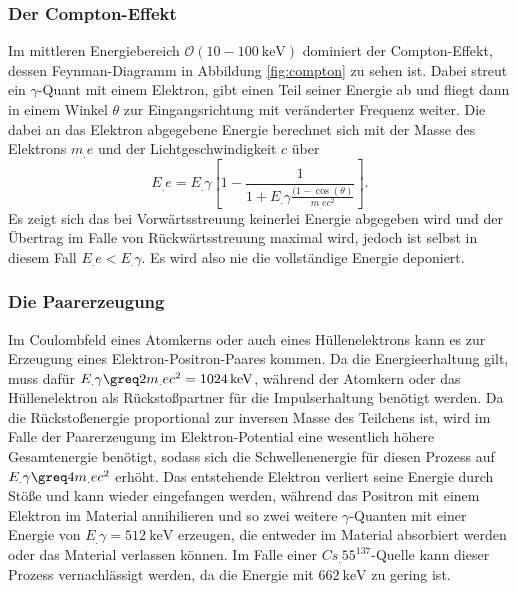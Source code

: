 \subsubsection{Der Compton-Effekt}

Im mittleren Energiebereich $\mathcal{O}(10 - \SI{100}{\kilo\eV})$ dominiert der Compton-Effekt, dessen Feynman-Diagramm in Abbildung \ref{fig:compton} zu sehen ist.
Dabei streut ein $\gamma$-Quant mit einem Elektron, gibt einen Teil seiner Energie ab und fliegt dann in einem Winkel $\theta$ zur Eingangsrichtung mit veränderter Frequenz weiter.
Die dabei an das Elektron abgegebene Energie berechnet sich mit der Masse des Elektrons $m_.e$ und der Lichtgeschwindigkeit $c$ über
\[
E_.e = E_.{\gamma}\left[1-\frac{1}{1+E_.{\gamma}\frac{(1-\cos(\theta)}{m_.ec^2}}\right]\text{.}
\]
Es zeigt sich das bei Vorwärtsstreuung keinerlei Energie abgegeben wird und der Übertrag im Falle von Rückwärtsstreuung maximal wird, jedoch ist selbst in diesem Fall $E_.e < E_.{\gamma}$. Es wird also nie die vollständige Energie deponiert.

\subsubsection{Die Paarerzeugung}

Im Coulombfeld eines Atomkerns oder auch eines Hüllenelektrons kann es zur Erzeugung eines Elektron-Positron-Paares kommen. Da die Energieerhaltung gilt, muss dafür $E_.{\gamma} \greq 2m_.ec^2 = \SI{1024}{\kilo\eV}$, während der Atomkern oder das Hüllenelektron als Rückstoßpartner für die Impulserhaltung benötigt werden. Da die Rückstoßenergie proportional zur inversen Masse des Teilchens ist, wird im Falle der Paarerzeugung im Elektron-Potential eine wesentlich höhere Gesamtenergie benötigt, sodass sich die Schwellenenergie für diesen Prozess auf $E_.{\gamma} \greq 4m_.ec^2$ erhöht. Das entstehende Elektron verliert seine Energie durch Stöße und kann wieder eingefangen werden, während das Positron mit einem Elektron im Material annihilieren und so zwei weitere $\gamma$-Quanten mit einer Energie von $E_.{\gamma}=\SI{512}{\kilo\eV}$ erzeugen, die entweder im Material absorbiert werden oder das Material verlassen können. 
Im Falle einer $Cs_.{55}^\text{137}$-Quelle kann dieser Prozess vernachlässigt werden, da die Energie mit $\SI{662}{\kilo\eV}$ zu gering ist.

